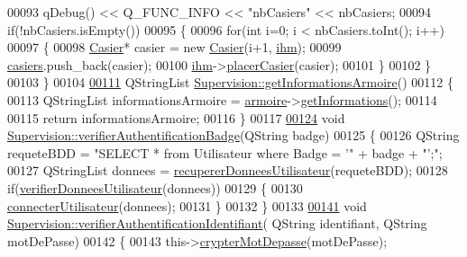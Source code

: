 \begin{DoxyCode}
00093     qDebug() << Q\_FUNC\_INFO << \textcolor{stringliteral}{"nbCasiers"} << nbCasiers;
00094     \textcolor{keywordflow}{if}(!nbCasiers.isEmpty())
00095     \{
00096         \textcolor{keywordflow}{for}(\textcolor{keywordtype}{int} i=0; i < nbCasiers.toInt(); i++)
00097         \{
00098             \hyperlink{class_casier}{Casier}* casier = \textcolor{keyword}{new} \hyperlink{class_casier}{Casier}(i+1, \hyperlink{class_supervision_a5aa823c55bf1531497bbb8fdbc6c5528}{ihm});
00099             \hyperlink{class_supervision_a3ac996538c83f3bd3df36095b0abb1b2}{casiers}.push\_back(casier);
00100             \hyperlink{class_supervision_a5aa823c55bf1531497bbb8fdbc6c5528}{ihm}->\hyperlink{class_ihm_a4ba75b0606c75d616dab3afd67660fd4}{placerCasier}(casier);
00101         \}
00102     \}
00103 \}
00104 
\hyperlink{class_supervision_a72bd93799fcf5423a5f0c5538d4ec892}{00111} QStringList \hyperlink{class_supervision_a72bd93799fcf5423a5f0c5538d4ec892}{Supervision::getInformationsArmoire}()
00112 \{
00113     QStringList informationsArmoire = \hyperlink{class_supervision_a9f974b5c47899192395e539a0f11034c}{armoire}->\hyperlink{class_armoire_a3e4d2ffc2fb91dd24d1160305ad36555}{getInformations}();
00114 
00115     \textcolor{keywordflow}{return} informationsArmoire;
00116 \}
00117 
\hyperlink{class_supervision_a07e7f0cd8b114182be56ebb5645e62fe}{00124} \textcolor{keywordtype}{void} \hyperlink{class_supervision_a07e7f0cd8b114182be56ebb5645e62fe}{Supervision::verifierAuthentificationBadge}(QString badge)
00125 \{
00126     QString requeteBDD = \textcolor{stringliteral}{"SELECT * from Utilisateur where Badge = '"} + badge + \textcolor{stringliteral}{"';"};
00127     QStringList donnees = \hyperlink{class_supervision_a137b6c505742a4ada6ab38193eef01dd}{recupererDonneesUtilisateur}(requeteBDD);
00128     \textcolor{keywordflow}{if}(\hyperlink{class_supervision_ae3400dad53c52bc09198e8d7f80e0e67}{verifierDonneesUtilisateur}(donnees))
00129     \{
00130         \hyperlink{class_supervision_a7c397ca5f79afa2709a657d7185dfbe1}{connecterUtilisateur}(donnees);
00131     \}
00132 \}
00133 
\hyperlink{class_supervision_ac596674d302f1f747d65c8334aa1ced9}{00141} \textcolor{keywordtype}{void} \hyperlink{class_supervision_ac596674d302f1f747d65c8334aa1ced9}{Supervision::verifierAuthentificationIdentifiant}(
      QString identifiant, QString motDePasse)
00142 \{
00143     this->\hyperlink{class_supervision_ac58c5b922ce85af75c2233cd3265d201}{crypterMotDepasse}(motDePasse);

\end{DoxyCode}
